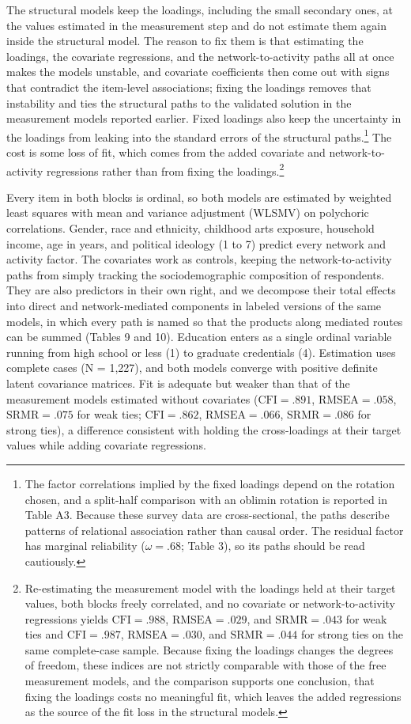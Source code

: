 \documentclass[
  12pt
]{article}
\begin{document}
The structural models keep the loadings, including the small secondary ones, at the values estimated in the measurement step and do not estimate them again inside the structural model. The reason to fix them is that estimating the loadings, the covariate regressions, and the network-to-activity paths all at once makes the models unstable, and covariate coefficients then come out with signs that contradict the item-level associations; fixing the loadings removes that instability and ties the structural paths to the validated solution in the measurement models reported earlier. Fixed loadings also keep the uncertainty in the loadings from leaking into the standard errors of the structural paths.\footnote{The factor correlations implied by the fixed loadings depend on the rotation chosen, and a split-half comparison with an oblimin rotation is reported in Table A3. Because these survey data are cross-sectional, the paths describe patterns of relational association rather than causal order. The residual factor has marginal reliability ($\omega = .68$; Table 3), so its paths should be read cautiously.} The cost is some loss of fit, which comes from the added covariate and network-to-activity regressions rather than from fixing the loadings.\footnote{Re-estimating the measurement model with the loadings held at their target values, both blocks freely correlated, and no covariate or network-to-activity regressions yields $\text{CFI} = .988$, $\text{RMSEA} = .029$, and $\text{SRMR} = .043$ for weak ties and $\text{CFI} = .987$, $\text{RMSEA} = .030$, and $\text{SRMR} = .044$ for strong ties on the same complete-case sample. Because fixing the loadings changes the degrees of freedom, these indices are not strictly comparable with those of the free measurement models, and the comparison supports one conclusion, that fixing the loadings costs no meaningful fit, which leaves the added regressions as the source of the fit loss in the structural models.}

Every item in both blocks is ordinal, so both models are estimated by weighted least squares with mean and variance adjustment (WLSMV) on polychoric correlations. Gender, race and ethnicity, childhood arts exposure, household income, age in years, and political ideology (1 to 7) predict every network and activity factor. The covariates work as controls, keeping the network-to-activity paths from simply tracking the sociodemographic composition of respondents. They are also predictors in their own right, and we decompose their total effects into direct and network-mediated components in labeled versions of the same models, in which every path is named so that the products along mediated routes can be summed (Tables 9 and 10). Education enters as a single ordinal variable running from high school or less (1) to graduate credentials (4). Estimation uses complete cases (N = 1,227), and both models converge with positive definite latent covariance matrices. Fit is adequate but weaker than that of the measurement models estimated without covariates ($\text{CFI} = .891$, $\text{RMSEA} = .058$, $\text{SRMR} = .075$ for weak ties; $\text{CFI} = .862$, $\text{RMSEA} = .066$, $\text{SRMR} = .086$ for strong ties), a difference consistent with holding the cross-loadings at their target values while adding covariate regressions.
\end{document}
